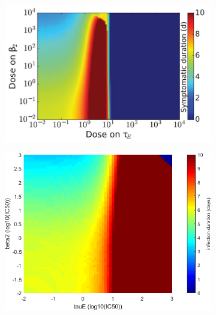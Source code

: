 \documentclass[a4paper,11pt]{article}
\begin{document}
\begin{figure}[H]
\begin{subfigure}{0.4\textwidth}
    \includegraphics[width=\textwidth]{MBeta2TauET.png}
    \end{subfigure}
    \begin{subfigure}{0.35\textwidth}
    
    \includegraphics[width=\textwidth]{Beta2TauE_times.png}
    \end{subfigure}
    
     \begin{subfigure}{0.4\textwidth}
    

\end{subfigure}
\end{figure}
\end{document}
